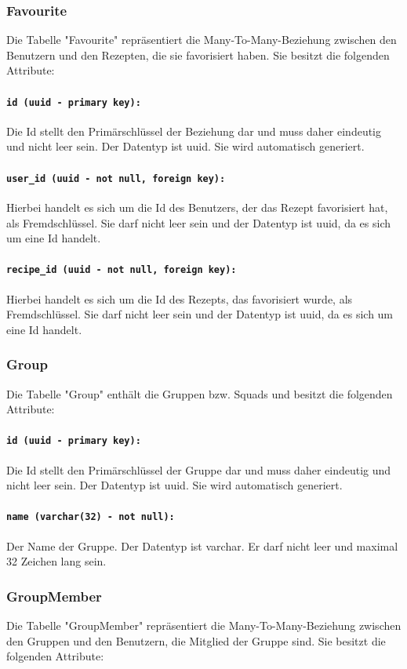 \documentclass{entwurfsheft}
\begin{document}
\subsubsection{Favourite}
Die Tabelle "Favourite" repräsentiert die Many-To-Many-Beziehung zwischen den Benutzern und den Rezepten, die sie favorisiert haben. Sie besitzt die folgenden Attribute:
\paragraph{\texttt{id (uuid - primary key):}} Die Id stellt den Primärschlüssel der Beziehung dar und muss daher eindeutig und nicht leer sein. Der Datentyp ist \Gls{uuid}. Sie wird automatisch generiert.
\paragraph{\texttt{user\_id (uuid - not null, foreign key):}} Hierbei handelt es sich um die Id des Benutzers, der das Rezept favorisiert hat, als Fremdschlüssel. Sie darf nicht leer sein und der Datentyp ist \Gls{uuid}, da es sich um eine Id handelt.
\paragraph{\texttt{recipe\_id (uuid - not null, foreign key):}} Hierbei handelt es sich um die Id des Rezepts, das favorisiert wurde, als Fremdschlüssel. Sie darf nicht leer sein und der Datentyp ist \Gls{uuid}, da es sich um eine Id handelt.
\newpage
\subsubsection{Group}
Die Tabelle "Group" enthält die Gruppen bzw. Squads und besitzt die folgenden Attribute:
\paragraph{\texttt{id (uuid - primary key):}} Die Id stellt den Primärschlüssel der Gruppe dar und muss daher eindeutig und nicht leer sein. Der Datentyp ist \Gls{uuid}. Sie wird automatisch generiert.
\paragraph{\texttt{name (varchar(32) - not null):}} Der Name der Gruppe. Der Datentyp ist \Gls{varchar}. Er darf nicht leer und maximal 32 Zeichen lang sein.
\newpage
\subsubsection{GroupMember}
Die Tabelle "GroupMember" repräsentiert die Many-To-Many-Beziehung zwischen den Gruppen und den Benutzern, die Mitglied der Gruppe sind. Sie besitzt die folgenden Attribute:
\end{document}
